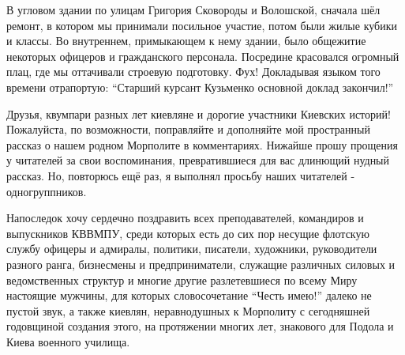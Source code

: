В угловом здании по
улицам Григория Сковороды и Волошской, сначала шёл ремонт, в котором мы
принимали посильное участие, потом были жилые кубики и классы. Во внутреннем,
примыкающем к нему здании, было общежитие некоторых офицеров и гражданского
персонала. Посредине красовался огромный плац, где мы оттачивали строевую
подготовку. Фух! Докладывая языком того времени отрапортую: \enquote{Старший курсант
Кузьменко основной доклад закончил!} 

Друзья, квумпари разных лет киевляне и
дорогие участники Киевских историй! Пожалуйста, по возможности, поправляйте и
дополняйте мой пространный рассказ о нашем родном Морполите в комментариях.
Нижайше прошу прощения у читателей за свои воспоминания, превратившиеся для вас
длинющий нудный рассказ. Но, повторюсь ещё раз, я выполнял просьбу наших
читателей - одногруппников. 

Напоследок хочу сердечно поздравить всех
преподавателей, командиров и выпускников КВВМПУ, среди которых есть до сих пор
несущие флотскую службу офицеры и адмиралы, политики, писатели, художники,
руководители разного ранга, бизнесмены и предприниматели, служащие различных
силовых и ведомственных структур и многие другие разлетевшиеся по всему Миру
настоящие мужчины,  для которых словосочетание \enquote{Честь имею!} далеко не пустой
звук, а также киевлян, неравнодушных к Морполиту с сегодняшней годовщиной
создания этого, на протяжении многих лет, знакового для Подола и Киева военного
училища.

